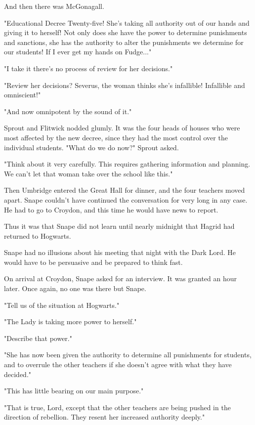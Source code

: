 And then there was McGonagall.

"Educational Decree Twenty-five! She's taking all authority out of our hands and giving it to herself! Not only does she have the power to determine punishments and sanctions, she has the authority to alter the punishments we determine for our students! If I ever get my hands on Fudge..."

"I take it there's no process of review for her decisions."

"Review her decisions? Severus, the woman thinks she's infallible! Infallible and omniscient!"

"And now omnipotent by the sound of it."

Sprout and Flitwick nodded glumly. It was the four heads of houses who were most affected by the new decree, since they had the most control over the individual students. "What do we do now?" Sprout asked.

"Think about it very carefully. This requires gathering information and planning. We can't let that woman take over the school like this."

Then Umbridge entered the Great Hall for dinner, and the four teachers moved apart. Snape couldn't have continued the conversation for very long in any case. He had to go to Croydon, and this time he would have news to report.

Thus it was that Snape did not learn until nearly midnight that Hagrid had returned to Hogwarts.

\sbreak

Snape had no illusions about his meeting that night with the Dark Lord. He would have to be persuasive and be prepared to think fast.

On arrival at Croydon, Snape asked for an interview. It was granted an hour later. Once again, no one was there but Snape.

"Tell us of the situation at Hogwarts."

"The Lady is taking more power to herself."

"Describe that power."

"She has now been given the authority to determine all punishments for students, and to overrule the other teachers if she doesn't agree with what they have decided."

"This has little bearing on our main purpose."

"That is true, Lord, except that the other teachers are being pushed in the direction of rebellion. They resent her increased authority deeply."

